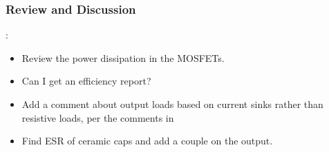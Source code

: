 \clearpage
\subsubsection{Review and Discussion}

:
\begin{itemize}
\item Review the power dissipation in the MOSFETs.
\item Can I get an efficiency report?
\item Add a comment about output loads based on current sinks rather
than resistive loads, per the comments in~\cite{Linear_DC247_1999}
\item Find ESR of ceramic caps and add a couple on the output.
\end{itemize}

